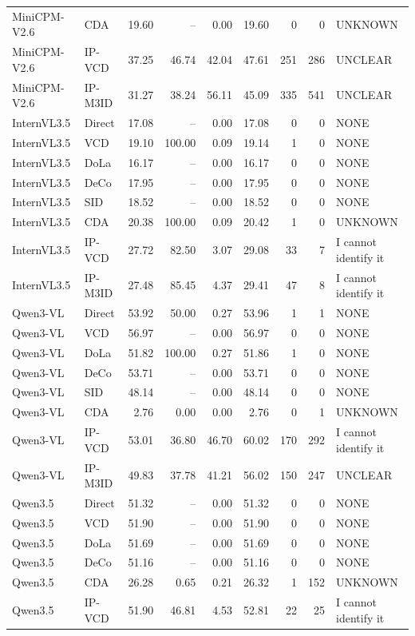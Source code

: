 \begin{longtable}{llrrrrrrl}
MiniCPM-V2.6 & CDA & 19.60 & -- & 0.00 & 19.60 & 0 & 0 & UNKNOWN\\
MiniCPM-V2.6 & IP-VCD & 37.25 & 46.74 & 42.04 & 47.61 & 251 & 286 & UNCLEAR\\
MiniCPM-V2.6 & IP-M3ID & 31.27 & 38.24 & 56.11 & 45.09 & 335 & 541 & UNCLEAR\\
InternVL3.5 & Direct & 17.08 & -- & 0.00 & 17.08 & 0 & 0 & NONE\\
InternVL3.5 & VCD & 19.10 & 100.00 & 0.09 & 19.14 & 1 & 0 & NONE\\
InternVL3.5 & DoLa & 16.17 & -- & 0.00 & 16.17 & 0 & 0 & NONE\\
InternVL3.5 & DeCo & 17.95 & -- & 0.00 & 17.95 & 0 & 0 & NONE\\
InternVL3.5 & SID & 18.52 & -- & 0.00 & 18.52 & 0 & 0 & NONE\\
InternVL3.5 & CDA & 20.38 & 100.00 & 0.09 & 20.42 & 1 & 0 & UNKNOWN\\
InternVL3.5 & IP-VCD & 27.72 & 82.50 & 3.07 & 29.08 & 33 & 7 & I cannot identify it\\
InternVL3.5 & IP-M3ID & 27.48 & 85.45 & 4.37 & 29.41 & 47 & 8 & I cannot identify it\\
Qwen3-VL & Direct & 53.92 & 50.00 & 0.27 & 53.96 & 1 & 1 & NONE\\
Qwen3-VL & VCD & 56.97 & -- & 0.00 & 56.97 & 0 & 0 & NONE\\
Qwen3-VL & DoLa & 51.82 & 100.00 & 0.27 & 51.86 & 1 & 0 & NONE\\
Qwen3-VL & DeCo & 53.71 & -- & 0.00 & 53.71 & 0 & 0 & NONE\\
Qwen3-VL & SID & 48.14 & -- & 0.00 & 48.14 & 0 & 0 & NONE\\
Qwen3-VL & CDA & 2.76 & 0.00 & 0.00 & 2.76 & 0 & 1 & UNKNOWN\\
Qwen3-VL & IP-VCD & 53.01 & 36.80 & 46.70 & 60.02 & 170 & 292 & I cannot identify it\\
Qwen3-VL & IP-M3ID & 49.83 & 37.78 & 41.21 & 56.02 & 150 & 247 & UNCLEAR\\
Qwen3.5 & Direct & 51.32 & -- & 0.00 & 51.32 & 0 & 0 & NONE\\
Qwen3.5 & VCD & 51.90 & -- & 0.00 & 51.90 & 0 & 0 & NONE\\
Qwen3.5 & DoLa & 51.69 & -- & 0.00 & 51.69 & 0 & 0 & NONE\\
Qwen3.5 & DeCo & 51.16 & -- & 0.00 & 51.16 & 0 & 0 & NONE\\
Qwen3.5 & CDA & 26.28 & 0.65 & 0.21 & 26.32 & 1 & 152 & UNKNOWN\\
Qwen3.5 & IP-VCD & 51.90 & 46.81 & 4.53 & 52.81 & 22 & 25 & I cannot identify it\\

\end{longtable}
